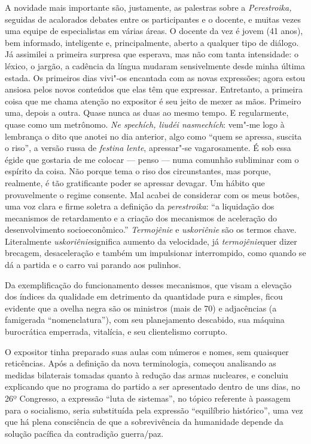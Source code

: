 A novidade mais importante são, justamente, as palestras sobre a
\emph{Perestroika,} seguidas de acalorados debates entre os
participantes e o docente, e muitas vezes uma equipe de especialistas em
várias áreas. O docente da vez é jovem (41 anos), bem informado,
inteligente e, principalmente, aberto a qualquer tipo de diálogo. Já
assimilei a primeira surpresa que esperava, mas não com tanta
intensidade: o léxico, o jargão, a cadência da língua mudaram
sensivelmente desde minha última estada. Os primeiros dias vivi"-os
encantada com as novas expressões; agora estou ansiosa pelos novos
conteúdos que elas têm que expressar. Entretanto, a primeira coisa que
me chama atenção no expositor é seu jeito de mexer as mãos. Primeiro
uma, depois a outra. Quase nunca as duas ao mesmo tempo. E regularmente,
quase como um metrônomo. \emph{Ne spechích, liudéi nasmechích}: vem"-me
logo à lembrança o dito que anotei no dia anterior, algo como ``quem se
apressa, suscita o riso'', a versão russa de \emph{festina lente},
apressar"-se vagarosamente. É sob essa égide que gostaria de me colocar
--- penso --- numa comunhão subliminar com o espírito da coisa. Não porque
tema o riso dos circunstantes, mas porque, realmente, é tão gratificante
poder se apressar devagar. Um hábito que provavelmente o regime
consente. Mal acabei de considerar com os meus botões, uma voz clara e
firme soletra a definição da \emph{perestroika}: ``a liquidação dos
mecanismos de retardamento e a criação dos mecanismos de aceleração do
desenvolvimento socioeconômico.'' \emph{Termojênie} e \emph{uskoriênie}
são os termos chave. Literalmente \emph{uskoriênie}significa aumento da
velocidade, já \emph{termojênie}quer dizer brecagem, desaceleração e
também um impulsionar interrompido, como quando se dá a partida e o
carro vai parando aos pulinhos.

Da exemplificação do funcionamento desses mecanismos, que visam a
elevação dos índices da qualidade em detrimento da quantidade pura e
simples, ficou evidente que a ovelha negra são os ministros (mais de 70)
e adjacências (a famigerada ``nomenclatura''), com seu planejamento
descabido, sua máquina burocrática emperrada, vitalícia, e seu
clientelismo corrupto.

O expositor tinha preparado suas aulas com números e nomes, sem
quaisquer reticências. Após a definição da nova terminologia, começou
analisando as medidas bilaterais tomadas quanto à redução das armas
nucleares, e concluiu explicando que no programa do partido a ser
apresentado dentro de uns dias, no 26º Congresso, a expressão ``luta de
sistemas'', no tópico referente à passagem para o socialismo, seria
substituída pela expressão ``equilíbrio histórico'', uma vez que há
plena consciência de que a sobrevivência da humanidade depende da
solução pacífica da contradição guerra/paz.

